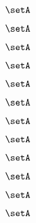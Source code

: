 {\begin{forslides}
        \begin{equation}
            \label{eq:slides-translation-85}
            \setA
        \end{equation}

        \begin{equation}
            \label{eq:slides-translation-86}
            \setA
        \end{equation}

        \begin{equation}
            \label{eq:slides-translation-87}
            \setA
        \end{equation}

        \begin{equation}
            \label{eq:slides-translation-88}
            \setA
        \end{equation}

        \begin{equation}
            \label{eq:slides-translation-89}
            \setA
        \end{equation}

        \begin{equation}
            \label{eq:slides-translation-90}
            \setA
        \end{equation}

        \begin{equation}
            \label{eq:slides-translation-91}
            \setA
        \end{equation}

        \begin{equation}
            \label{eq:slides-translation-92}
            \setA
        \end{equation}

        \begin{equation}
            \label{eq:slides-translation-93}
            \setA
        \end{equation}

        \begin{equation}
            \label{eq:slides-translation-94}
            \setA
        \end{equation}

        \begin{equation}
            \label{eq:slides-translation-95}
            \setA
        \end{equation}

        \begin{equation}
            \label{eq:slides-translation-96}
            \setA
        \end{equation}


\end{forslides}}

